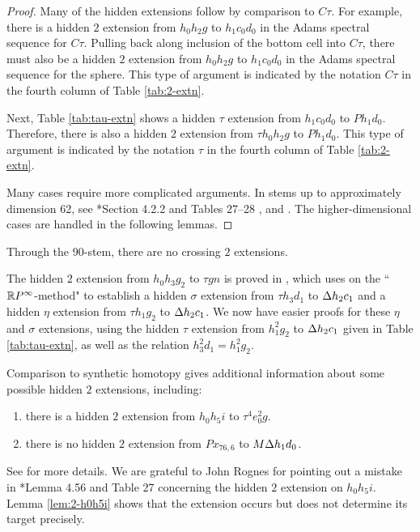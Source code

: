 \begin{proof}
Many of the hidden extensions follow by comparison to 
$C\tau$.  For example, there is a hidden $2$ extension
from $h_0 h_2 g$ to $h_1 c_0 d_0$ in the Adams spectral
sequence for $C\tau$.
Pulling back along inclusion of the bottom cell into $C\tau$,
there must also be a hidden $2$ extension from $h_0 h_2 g$
to $h_1 c_0 d_0$ in the Adams spectral sequence for the sphere.
This type of argument is indicated by the notation
$C\tau$ in the fourth column of Table \ref{tab:2-extn}.

Next, Table \ref{tab:tau-extn} shows a hidden $\tau$
extension from $h_1 c_0 d_0$ to $P h_1 d_0$.
Therefore, there is also a hidden $2$ extension from
$\tau h_0 h_2 g$ to $P h_1 d_0$.
This type of argument is indicated by the notation $\tau$
in the fourth column of Table \ref{tab:2-extn}. 

Many cases require more complicated arguments.  In stems up to
approximately dimension 62, see 
\cite{Isaksen14c}*{Section 4.2.2 and Tables 27--28}
\cite{WangXu18}, and \cite{Xu16}.
The higher-dimensional cases are handled in the following lemmas.
\end{proof}

\begin{remark}
Through the 90-stem, there are no crossing $2$ extensions.
\end{remark}

\begin{remark}
The hidden $2$ extension from $h_0 h_3 g_2$ to $\tau g n$
is proved in \cite{WangXu18}, which uses on the
``$\mathbb{R} P^\infty$-method" to establish a hidden
$\sigma$ extension from $\tau h_3 d_1$ to $\Delta h_2 c_1$
and a hidden $\eta$ extension from $\tau h_1 g_2$ to $\Delta h_2 c_1$.
We now have easier proofs for these $\eta$ and $\sigma$ extensions,
using the hidden $\tau$ extension from $h_1^2 g_2$ to $\Delta h_2 c_1$
given in Table \ref{tab:tau-extn}, as well as the relation
$h_3^2 d_1 = h_1^2 g_2$.
\end{remark}

\begin{remark}
\label{rem:2-h0h5i}
Comparison to synthetic homotopy gives additional
information about some
possible hidden $2$ extensions, including:
\begin{enumerate}
\item
there is a hidden $2$ extension from $h_0 h_5 i$ to
$\tau^4 e_0^2 g$.
\item
there is no hidden $2$ extension from $P x_{76,6}$ 
to $M \Delta h_1 d_0$.
\end{enumerate}
See  \cite{BIX} for more details.
We are grateful to John Rognes for pointing out a mistake
in \cite{Isaksen14c}*{Lemma 4.56 and Table 27} 
concerning the hidden $2$ extension
on $h_0 h_5 i$.  
Lemma \ref{lem:2-h0h5i} shows that the extension occurs but
does not determine its target precisely.  
\end{remark}

